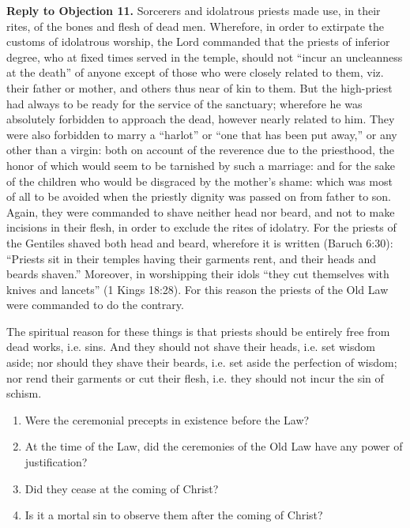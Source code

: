 \textbf{Reply to Objection 11.} Sorcerers and idolatrous priests made use, in their rites, of the bones and flesh of dead men. Wherefore, in order to extirpate the customs of idolatrous worship, the Lord commanded that the priests of inferior degree, who at fixed times served in the temple, should not ``incur an uncleanness at the death'' of anyone except of those who were closely related to them, viz. their father or mother, and others thus near of kin to them. But the high-priest had always to be ready for the service of the sanctuary; wherefore he was absolutely forbidden to approach the dead, however nearly related to him. They were also forbidden to marry a ``harlot'' or ``one that has been put away,'' or any other than a virgin: both on account of the reverence due to the priesthood, the honor of which would seem to be tarnished by such a marriage: and for the sake of the children who would be disgraced by the mother's shame: which was most of all to be avoided when the priestly dignity was passed on from father to son. Again, they were commanded to shave neither head nor beard, and not to make incisions in their flesh, in order to exclude the rites of idolatry. For the priests of the Gentiles shaved both head and beard, wherefore it is written (Baruch 6:30): ``Priests sit in their temples having their garments rent, and their heads and beards shaven.'' Moreover, in worshipping their idols ``they cut themselves with knives and lancets'' (1 Kings 18:28). For this reason the priests of the Old Law were commanded to do the contrary.

The spiritual reason for these things is that priests should be entirely free from dead works, i.e. sins. And they should not shave their heads, i.e. set wisdom aside; nor should they shave their beards, i.e. set aside the perfection of wisdom; nor rend their garments or cut their flesh, i.e. they should not incur the sin of schism.


\begin{enumerate}

\item  Were the ceremonial precepts in existence before the Law? 
\item  At the time of the Law, did the ceremonies of the Old Law have any power of justification? 
\item  Did they cease at the coming of Christ? 
\item  Is it a mortal sin to observe them after the coming of Christ? 
\end{enumerate}

